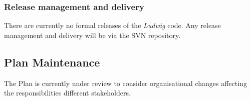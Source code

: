 


\subsubsection{Release management and delivery}

There are currently no formal releases of the \textit{Ludwig} code.
Any release management and  delivery will be via the SVN repository.





\subsection{Plan Maintenance}

The Plan is currently under review to consider organisational changes
affecting the responsibilities different stakeholders.




